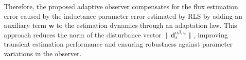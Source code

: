 Therefore, the proposed adaptive observer compensates for the flux estimation error caused by the inductance parameter error estimated by RLS by adding an auxiliary term \(\mathbf{w}\) to the estimation dynamics through an adaptation law. This approach reduces the norm of the disturbance vector \(\|\mathbf{d}^{\alpha\beta,\psi}_s\|\), improving transient estimation performance and ensuring robustness against parameter variations in the observer.